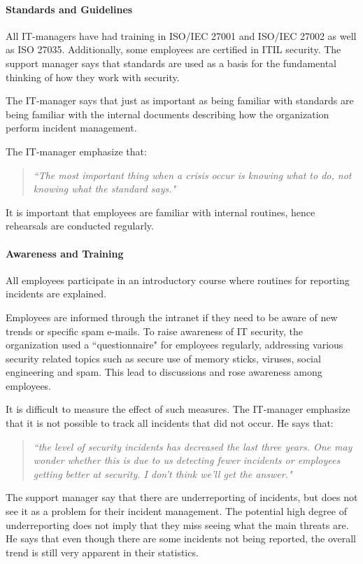 \paragraph{Standards and Guidelines}
All IT-managers have had training in ISO/IEC 27001 and ISO/IEC 27002 as well as ISO 27035. Additionally, some employees are certified in ITIL security. 
The support manager says that standards are used as a basis for the fundamental thinking of how they work with security.  

The IT-manager says that just as important as being familiar with standards are being familiar with the internal documents describing how the organization perform incident management. 

The IT-manager emphasize that:
\begin{quote}
\textit{``The most important thing when a crisis occur is knowing what to do, not knowing what the standard says."}
\end{quote}
It is important that employees are familiar with internal routines, hence rehearsals are conducted regularly.

\paragraph{Awareness and Training}

All employees participate in an introductory course where routines for reporting incidents are explained. 

Employees are informed through the intranet if they need to be aware of new trends or specific spam e-mails. To raise awareness of IT security, the organization used a ``questionnaire" for employees regularly, addressing various security related topics such as secure use of memory sticks, viruses, social engineering and spam. This lead to discussions and rose awareness among employees. 

It is difficult to measure the effect of such measures. The IT-manager emphasize that it is not possible to track all incidents that did not occur. He says that:
\begin{quote}
\textit{``the level of security incidents has decreased the last three years. One may wonder whether this is due to us detecting fewer incidents or employees getting better at security. I don't think we'll get the answer."}
\end{quote}

The support manager say that there are underreporting of incidents, but does not see it as a problem for their incident management. The potential high degree of underreporting does not imply that they miss seeing what the main threats are. He says that even though there are some incidents not being reported, the overall trend is still very apparent in their statistics. 
 
